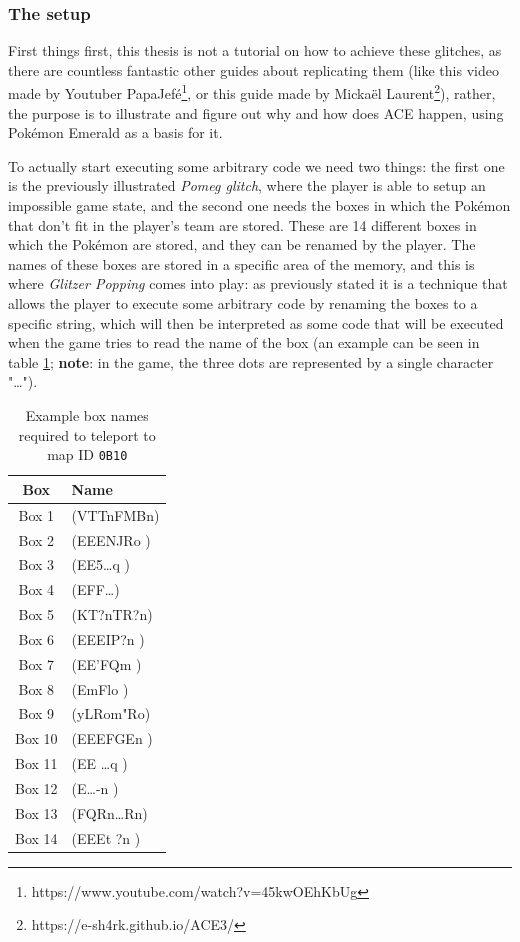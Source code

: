 \documentclass[a4paper]{usiinfbachelorproject}
\begin{document}
\subsubsection{The setup}
\label{sec:setup}
First things first, this thesis is not a tutorial on how to achieve these glitches, as there are countless fantastic other guides about replicating them (like this video made by Youtuber PapaJefé\footnote{https://www.youtube.com/watch?v=45kwOEhKbUg}, or this guide made by Mickaël Laurent\footnote{https://e-sh4rk.github.io/ACE3/}), rather, the purpose is to illustrate and figure out why and how does ACE happen, using Pokémon Emerald as a basis for it.

To actually start executing some arbitrary code we need two things: the first one is the previously illustrated \textit{Pomeg glitch}, where the player is able to setup an impossible game state, and the second one needs the boxes in which the Pokémon that don't fit in the player's team are stored. These are 14 different boxes in which the Pokémon are stored, and they can be renamed by the player. The names of these boxes are stored in a specific area of the memory, and this is where \textit{Glitzer Popping} comes into play: as previously stated it is a technique that allows the player to execute some arbitrary code by renaming the boxes to a specific string, which will then be interpreted as some code that will be executed when the game tries to read the name of the box (an example can be seen in table \ref{tab:boxes_names}; \textbf{note}: in the game, the three dots are represented by a single character "\dots").

\begin{table}[h!]
	\centering
	\begin{tabular}{|c|l|}
		\hline
		\textbf{Box} & \textbf{Name}  \\
		\hline
		Box 1        & (VTTnFMBn)     \\
		Box 2        & (EEENJRo )     \\
		Box 3        & (EE5\dots q  ) \\
		Box 4        & (EFF\dots    ) \\
		Box 5        & (KT?nTR?n)     \\
		Box 6        & (EEEIP?n )     \\
		Box 7        & (EE'FQm  )     \\
		Box 8        & (EmFlo   )     \\
		Box 9        & (yLRom"Ro)     \\
		Box 10       & (EEEFGEn )     \\
		Box 11       & (EE \dots q  ) \\
		Box 12       & (E\dots -n   ) \\
		Box 13       & (FQRn\dots Rn) \\
		Box 14       & (EEEt ?n )     \\
		\hline
	\end{tabular}
	\caption{Example box names required to teleport to map ID \texttt{0B10}}
	\label{tab:boxes_names}
\end{table}
\end{document}
